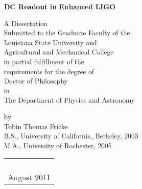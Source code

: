 \thispagestyle{empty}
\begin{center}
\textbf{DC Readout in Enhanced LIGO}
\vspace{1.75in}

A Dissertation\\
\vspace{1ex}
Submitted to the Graduate Faculty of the\\
Louisiana State University and\\
Agricultural and Mechanical College\\
in partial fulfillment of the\\
requirements for the degree of\\
Doctor of Philosophy\\
\vspace{1ex}
in\\
\vspace{1ex}
The Department of Physics and Astronomy\\
\vspace{1in}
\texttt{\color{red}{Compiled \today}}
\vspace{0.75in}

by\\
Tobin Thomas Fricke \\
B.S., University of California, Berkeley, 2003\\
M.A., University of Rochester, 2005 \\

\begin{tabular}{c}
\\
\\
\\
\\
\\
August 2011
\end{tabular}

\end{center}

